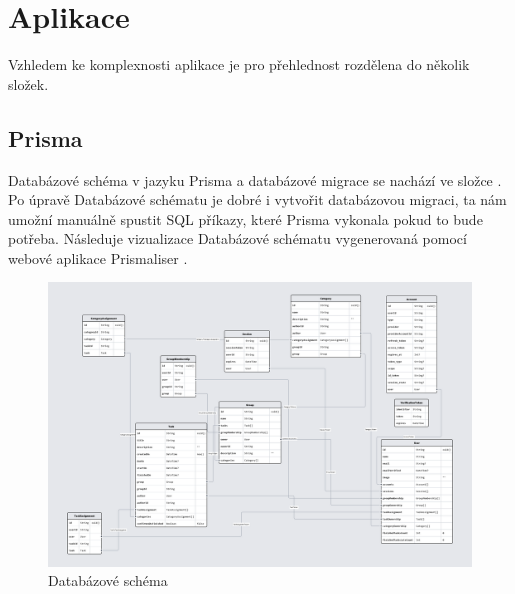 \chapter{Aplikace}
Vzhledem ke komplexnosti aplikace je pro přehlednost rozdělena do několik složek.
\section{Prisma}

Databázové schéma v jazyku Prisma a databázové migrace se nachází ve složce . Po úpravě Databázové schématu je dobré i vytvořit databázovou migraci, ta nám umožní manuálně spustit SQL příkazy, které Prisma vykonala pokud to bude potřeba.
Následuje vizualizace Databázové schématu vygenerovaná pomocí webové aplikace Prismaliser \cite{prismaliser}.
\begin{figure}[hbt!]
    \includegraphics[width=1\linewidth]{img/DB_schema.png}
    \caption{Databázové schéma}
\end{figure}

